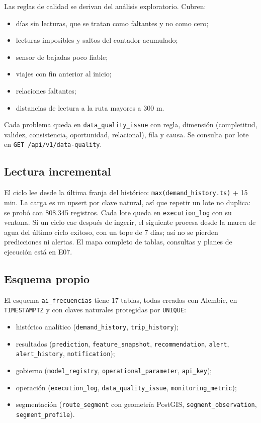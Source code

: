\documentclass[10pt,a4paper]{article}
\newcommand{\cod}[1]{\texttt{\small #1}}
\begin{document}
Las reglas de calidad se derivan del análisis exploratorio. Cubren:

\begin{itemize}
  \item días sin lecturas, que se tratan como faltantes y no como cero;
  \item lecturas imposibles y saltos del contador acumulado;
  \item sensor de bajadas poco fiable;
  \item viajes con fin anterior al inicio;
  \item relaciones faltantes;
  \item distancias de lectura a la ruta mayores a 300 m.
\end{itemize}

Cada problema queda en \cod{data\_quality\_issue} con regla, dimensión (completitud, validez, consistencia, oportunidad, relacional), fila y causa. Se consulta por lote en \cod{GET /api/v1/data-quality}.

\subsection{Lectura incremental}

El ciclo lee desde la última franja del histórico: \cod{max(demand\_history.ts)} + 15 min. La carga es un upsert por clave natural, así que repetir un lote no duplica: se probó con 808.345 registros. Cada lote queda en \cod{execution\_log} con su ventana. Si un ciclo cae después de ingerir, el siguiente procesa desde la marca de agua del último ciclo exitoso, con un tope de 7 días; así no se pierden predicciones ni alertas. El mapa completo de tablas, consultas y planes de ejecución está en E07.

\subsection{Esquema propio}

El esquema \cod{ai\_frecuencias} tiene 17 tablas, todas creadas con Alembic, en \cod{TIMESTAMPTZ} y con claves naturales protegidas por \cod{UNIQUE}:

\begin{itemize}
  \item histórico analítico (\cod{demand\_history}, \cod{trip\_history});
  \item resultados (\cod{prediction}, \cod{feature\_snapshot}, \cod{recommendation}, \cod{alert}, \cod{alert\_history}, \cod{notification});
  \item gobierno (\cod{model\_registry}, \cod{operational\_parameter}, \cod{api\_key});
  \item operación (\cod{execution\_log}, \cod{data\_quality\_issue}, \cod{monitoring\_metric});
  \item segmentación (\cod{route\_segment} con geometría PostGIS, \cod{segment\_observation}, \cod{segment\_profile}).
\end{itemize}
\end{document}
